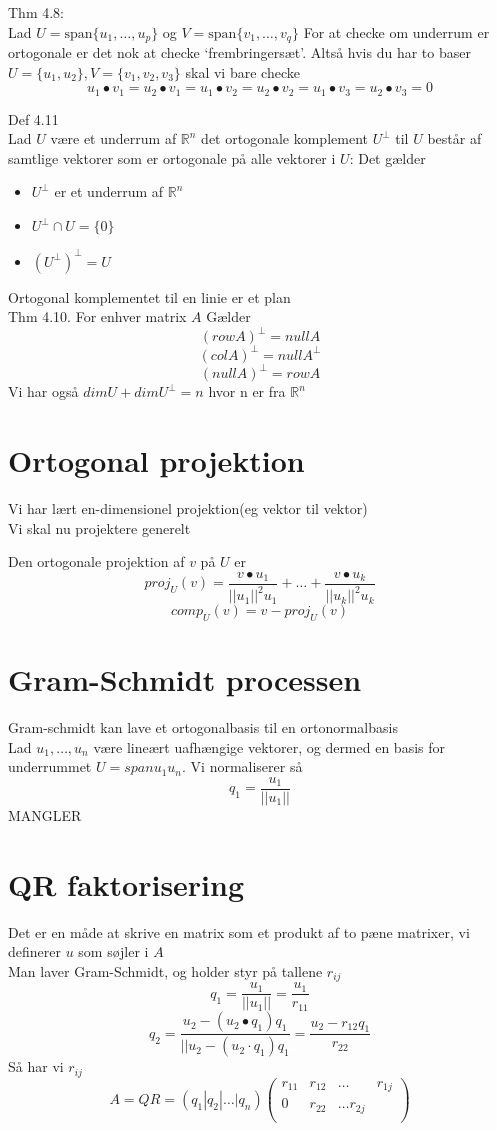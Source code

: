 \documentclass[a4paper,fleqn]{report}
\newcommand{\RR}{\mathbb{R}}
\begin{document}
	Thm 4.8:\\
	Lad $U = \text{span}\{u_1,\dots,u_p\}$ og $V = \text{span}\{v_1,\dots,v_q\}$
	For at checke om underrum er ortogonale er det nok at checke `frembringersæt'. Altså hvis
	du har to baser $U = \{u_1, u_2\}, V = \{v_1, v_2, v_3\}$ skal vi bare checke 
	\[ u_1 \bullet v_1 = u_2 \bullet v_1 = u_1 \bullet v_2 = u_2 \bullet v_2 = u_1 \bullet v_3= 
	u_2 \bullet v_3 = 0\]


	Def 4.11\\
	Lad $U$ være et underrum af $\RR^n$ det ortogonale komplement $U^\perp$ til $U$ består af
	samtlige vektorer som er ortogonale på alle vektorer i $U$: Det gælder
	\begin{itemize}
		\item $U^\perp$ er et underrum af $\RR^n$
		\item $U^\perp \cap U = \{0\}$
		\item $(U^\perp)^\perp = U$
	\end{itemize}
	Ortogonal komplementet til en linie er et plan\\

	Thm 4.10. For enhver matrix $A$ Gælder \[ (row A)^\perp = null A\]
	\[(col A)^\perp = null A^\perp\]\[(null A)^\perp = row A\]
	Vi har også $dim U + dim U^\perp = n$ hvor n er fra $\RR^n$

	\section{Ortogonal projektion}
	Vi har lært en-dimensionel projektion(eg vektor til vektor)\\ Vi skal nu projektere generelt

	Den ortogonale projektion af $v$ på $U$ er 
	\[ proj_U(v) = \frac{v\bullet u_1}{||u_1||^2 u_1}+ \dots + 
		\frac{v\bullet u_k}{||u_k||^2 u_k }
		\]
			\[comp_U(v) = v-proj_U(v)\]

	\section{Gram-Schmidt processen}
	Gram-schmidt kan lave et ortogonalbasis til en ortonormalbasis\\
	Lad $u_1, \dots, u_n$ være lineært uafhængige vektorer, og dermed en basis for underrummet
	$U = span u_1 u_n$. Vi normaliserer så
	\[ q_1 = \frac{u_1}{||u_1||}\]
	MANGLER

	\section{QR faktorisering}
	Det er en måde at skrive en matrix som et produkt af to pæne matrixer, vi definerer $u$ som søjler
	i $A$\\
	Man laver Gram-Schmidt, og holder styr på tallene $r_{ij}$
	\[ q_1 = \frac{u_1}{||u_1||} = \frac{u_1}{r_{11}} \]
	\[ q_2 = \frac{u_2 - (u_2 \bullet q_1)q_1}{||u_2 - (u_2 \cdot q_1)q_1} = \frac{u_2 - r_{12}q_1}{r_{22}}\]
	Så har vi $r_{ij}$
	\[ A = QR = (q_1 |q_2 | \dots | q_n)
		\begin{pmatrix}
			r_{11}&r_{12}&\dots&r_{1j}\\
			0 & r_{22} & \dots r_{2j}\\
		\end{pmatrix}
	\]
\end{document}
